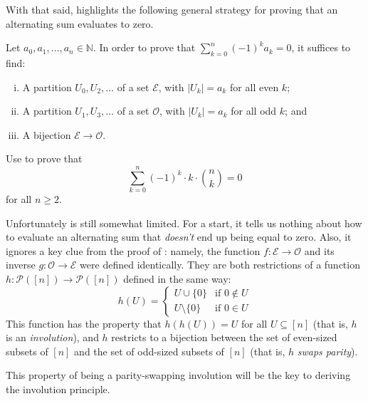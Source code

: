 With that said,  highlights the following general strategy for proving that an alternating sum evaluates to zero.

\begin{strategy}
\label{strPrimitiveInvolutionPrinciple}
Let $a_0,a_1,\dots,a_n \in \mathbb{N}$. In order to prove that $\displaystyle \sum_{k=0}^n (-1)^k a_k = 0$, it suffices to find:
\begin{enumerate}[(i)]
\item A partition $U_0, U_2, \dots$ of a set $\mathcal{E}$, with $|U_k| = a_k$ for all even $k$;
\item A partition $U_1, U_3, \dots$ of a set $\mathcal{O}$, with $|U_k| = a_k$ for all odd $k$; and
\item A bijection $\mathcal{E} \to \mathcal{O}$.
\end{enumerate}
\end{strategy}

\begin{exercise}
\label{exAlternatingSumOfKTimesBinomialCoefficientByPrimitiveInvolutionPrinciple}
Use  to prove that
\[ \displaystyle \sum_{k=0}^n (-1)^k \cdot k \cdot \binom{n}{k} = 0 \]
for all $n \ge 2$.
\end{exercise}

Unfortunately  is still somewhat limited. For a start, it tells us nothing about how to evaluate an alternating sum that \textit{doesn't} end up being equal to zero. Also, it ignores a key clue from the proof of : namely, the function $f : \mathcal{E} \to \mathcal{O}$ and its inverse $g : \mathcal{O} \to \mathcal{E}$ were defined identically. They are both restrictions of a function $h : \mathcal{P}([n]) \to \mathcal{P}([n])$ defined in the same way:
\[ h(U) = \begin{cases} U \cup \{ 0 \} & \text{if $0 \not\in U$} \\ U \setminus \{ 0 \} & \text{if $0 \in U$} \end{cases} \]
This function has the property that $h(h(U)) = U$ for all $U \subseteq [n]$ (that is, $h$ is an \textit{involution}), and $h$ restricts to a bijection between the set of even-sized subsets of $[n]$ and the set of odd-sized subsets of $[n]$ (that is, $h$ \textit{swaps parity}).

This property of being a parity-swapping involution will be the key to deriving the involution principle.

